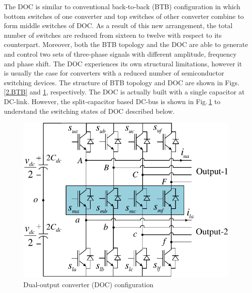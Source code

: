 The DOC is similar to conventional back-to-back (BTB) configuration in which bottom switches of one converter and top switches of other converter combine to form middle switches of DOC. As a result of this new arrangement, the total number of switches are reduced from sixteen to twelve with respect to its counterpart. Moreover, both the BTB topology and the DOC are able to generate and control two sets of three-phase signals with different amplitude, frequency and phase shift. The DOC experiences its own structural limitations, however it is usually the case for converters with a reduced number of semiconductor switching devices. The structure of BTB topology and DOC are shown in Figs.\,\ref{2.BTB} and \ref{2.DOC}, respectively. The DOC is actually built with a single capacitor at DC-link. However, the split-capacitor based DC-bus is shown in Fig.\,\ref{2.DOC} to understand the switching states of DOC described below. 
\begin{figure}[ht]
	\centering
		\includegraphics[scale=0.88]{figures/Chapter_1_2/DOC}
	\caption{Dual-output converter (DOC) configuration}
	\label{2.DOC}
\end{figure}
